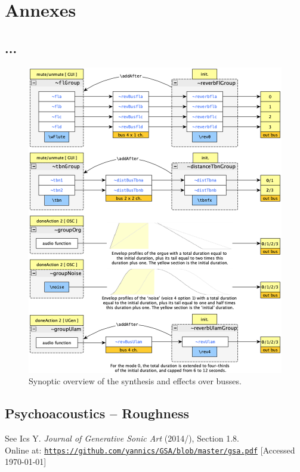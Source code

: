 \documentclass{article}
\begin{document}
\section*{Annexes}

\label{annexes}

\subsection*{...}

\begin{figure}[H]
\centering
\includegraphics[width=\textwidth-1mm]{../img/9940}
\caption*{Synoptic overview of the synthesis and effects over busses.}
\label{struc}
\end{figure}

\newpage

\subsection*{Psychoacoustics -- Roughness}

See Ics Y. \textit{Journal of Generative Sonic Art} (2014/\the\year), Section 1.8.\\ Online at: \href{https://github.com/yannics/GSA/blob/master/gsa.pdf}{\texttt{\small https://github.com/yannics/GSA/blob/master/gsa.pdf}} [Accessed \today]
\end{document}
